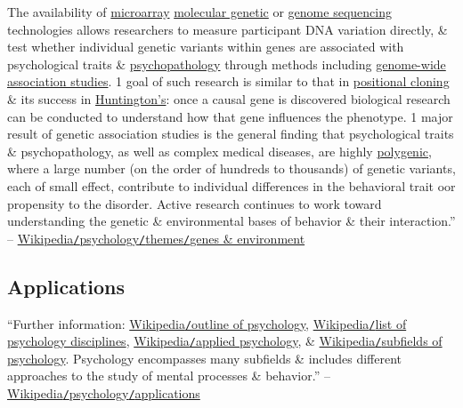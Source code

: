 \documentclass[oneside]{book}
\numberwithin{equation}{section}
\begin{document}
The availability of \href{https://en.wikipedia.org/wiki/Microarray}{microarray} \href{https://en.wikipedia.org/wiki/Molecular_genetics}{molecular genetic} or \href{https://en.wikipedia.org/wiki/Genome_sequencing}{genome sequencing} technologies allows researchers to measure participant DNA variation directly, \& test whether individual genetic variants within genes are associated with psychological traits \& \href{https://en.wikipedia.org/wiki/Psychopathology}{psychopathology} through methods including \href{https://en.wikipedia.org/wiki/Genome-wide_association_studies}{genome-wide association studies}. 1 goal of such research is similar to that in \href{https://en.wikipedia.org/wiki/Positional_cloning}{positional cloning} \& its success in \href{https://en.wikipedia.org/wiki/Huntington%27s}{Huntington's}: once a causal gene is discovered biological research can be conducted to understand how that gene influences the phenotype. 1 major result of genetic association studies is the general finding that psychological traits \& psychopathology, as well as complex medical diseases, are highly \href{https://en.wikipedia.org/wiki/Polygenic}{polygenic}, where a large number (on the order of hundreds to thousands) of genetic variants, each of small effect, contribute to individual differences in the behavioral trait oor propensity to the disorder. Active research continues to work toward understanding the genetic \& environmental bases of behavior \& their interaction.'' -- \href{https://en.wikipedia.org/wiki/Psychology#Genes_and_environment}{Wikipedia\texttt{/}psychology\texttt{/}themes\texttt{/}genes \& environment}

\subsection{Applications}
``Further information: \href{https://en.wikipedia.org/wiki/Outline_of_psychology}{Wikipedia\texttt{/}outline of psychology}, \href{https://en.wikipedia.org/wiki/List_of_psychology_disciplines}{Wikipedia\texttt{/}list of psychology disciplines}, \href{https://en.wikipedia.org/wiki/Applied_psychology}{Wikipedia\texttt{/}applied psychology}, \& \href{https://en.wikipedia.org/wiki/Subfields_of_psychology}{Wikipedia\texttt{/}subfields of psychology}. Psychology encompasses many subfields \& includes different approaches to the study of mental processes \& behavior.'' -- \href{https://en.wikipedia.org/wiki/Psychology#Applications}{Wikipedia\texttt{/}psychology\texttt{/}applications}
\end{document}
